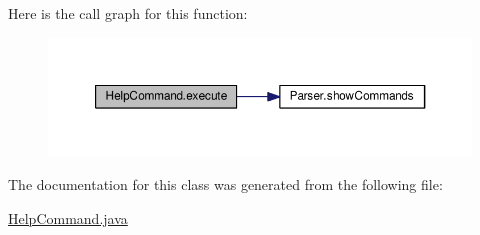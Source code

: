 Here is the call graph for this function\-:
\nopagebreak
\begin{figure}[H]
\begin{center}
\leavevmode
\includegraphics[width=350pt]{classHelpCommand_ac93c4d17e1bed11f86d0f3c21ba00e34_cgraph}
\end{center}
\end{figure}




The documentation for this class was generated from the following file\-:\begin{DoxyCompactItemize}
\item 
\hyperlink{HelpCommand_8java}{Help\-Command.\-java}\end{DoxyCompactItemize}
